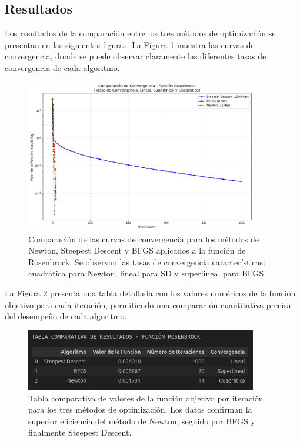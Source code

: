 \documentclass{article}
\begin{document}
\subsection{Resultados}
\setcounter{equation}{0}

Los resultados de la comparación entre los tres métodos de optimización se presentan en las siguientes figuras. La Figura 1 muestra las curvas de convergencia, donde se puede observar claramente las diferentes tasas de convergencia de cada algoritmo.

\begin{figure}[H]
    \centering
    \includegraphics[width=0.9\textwidth]{images/6_convergencia.png}
    \caption{Comparación de las curvas de convergencia para los métodos de Newton, Steepest Descent y BFGS aplicados a la función de Rosenbrock. Se observan las tasas de convergencia características: cuadrática para Newton, lineal para SD y superlineal para BFGS.}
\end{figure}

La Figura 2 presenta una tabla detallada con los valores numéricos de la función objetivo para cada iteración, permitiendo una comparación cuantitativa precisa del desempeño de cada algoritmo.

\begin{figure}[H]
    \centering
    \includegraphics[width=0.9\textwidth]{images/6_tabla_resultados.png}
    \caption{Tabla comparativa de valores de la función objetivo por iteración para los tres métodos de optimización. Los datos confirman la superior eficiencia del método de Newton, seguido por BFGS y finalmente Steepest Descent.}
\end{figure}
\end{document}
